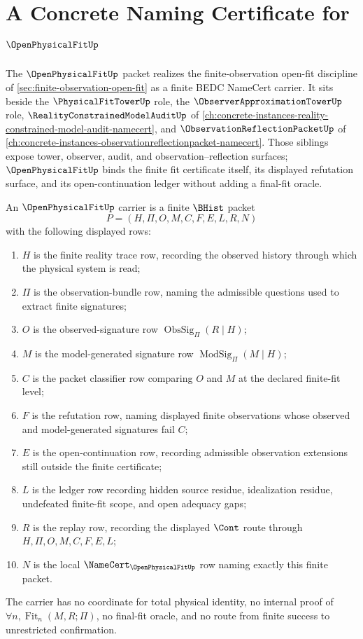 \chapter{A Concrete Naming Certificate for $\OpenPhysicalFitUp$}
\label{ch:concrete-instances-open-physical-fit-namecert}

The $\OpenPhysicalFitUp$ packet realizes the finite-observation open-fit discipline of \autoref{sec:finite-observation-open-fit} as a finite BEDC NameCert carrier. It sits beside the $\PhysicalFitTowerUp$ role, the $\ObserverApproximationTowerUp$ role, $\RealityConstrainedModelAuditUp$ of \autoref{ch:concrete-instances-reality-constrained-model-audit-namecert}, and $\ObservationReflectionPacketUp$ of \autoref{ch:concrete-instances-observationreflectionpacket-namecert}. Those siblings expose tower, observer, audit, and observation--reflection surfaces; $\OpenPhysicalFitUp$ binds the finite fit certificate itself, its displayed refutation surface, and its open-continuation ledger without adding a final-fit oracle.

\begin{definition}
\label{def:open-physical-fit-carrier}
An $\OpenPhysicalFitUp$ carrier is a finite $\BHist$ packet
$$
P=(H,\Pi,O,M,C,F,E,L,R,N)
$$
with the following displayed rows:
\begin{enumerate}
\item $H$ is the finite reality trace row, recording the observed history through which the physical system is read;
\item $\Pi$ is the observation-bundle row, naming the admissible questions used to extract finite signatures;
\item $O$ is the observed-signature row $\operatorname{ObsSig}_{\Pi}(R\mid H)$;
\item $M$ is the model-generated signature row $\operatorname{ModSig}_{\Pi}(M\mid H)$;
\item $C$ is the packet classifier row comparing $O$ and $M$ at the declared finite-fit level;
\item $F$ is the refutation row, naming displayed finite observations whose observed and model-generated signatures fail $C$;
\item $E$ is the open-continuation row, recording admissible observation extensions still outside the finite certificate;
\item $L$ is the ledger row recording hidden source residue, idealization residue, undefeated finite-fit scope, and open adequacy gaps;
\item $R$ is the replay row, recording the displayed $\Cont$ route through $H,\Pi,O,M,C,F,E,L$;
\item $N$ is the local $\NameCert_{\OpenPhysicalFitUp}$ row naming exactly this finite packet.
\end{enumerate}
The carrier has no coordinate for total physical identity, no internal proof of $\forall n,\operatorname{Fit}_n(M,R;\Pi)$, no final-fit oracle, and no route from finite success to unrestricted confirmation.
\end{definition}

